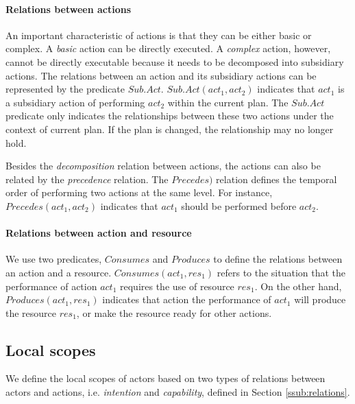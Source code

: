 \paragraph*{Relations between actions} %
\label{par:relations_between_actions}
An important characteristic of actions is that they can be either basic or complex. A \emph{basic} action can be directly executed. A \emph{complex} action, however, cannot be directly executable because it needs to be decomposed into subsidiary actions. The relations between an action and its subsidiary actions can be represented by the predicate $Sub.Act$. $Sub.Act(act_1, act_2)$ indicates that $act_1$ is a subsidiary action of performing $act_2$ within the current plan. The $Sub.Act$ predicate only indicates the relationships between these two actions under the context of current plan. If the plan is changed, the relationship may no longer hold.

Besides the \emph{decomposition} relation between actions, the actions can also be related by the \emph{precedence} relation. The $Precedes)$ relation defines the temporal order of performing two actions at the same level. For instance, $Precedes(act_1, act_2)$ indicates that $act_1$ should be performed before $act_2$. 

\paragraph*{Relations between action and resource} %
\label{par:relations_between_action_and_resource}
We use two predicates, $Consumes$ and $Produces$ to define the relations between an action and a resource. $Consumes(act_1, res_1)$ refers to the situation that the performance of action $act_1$ requires the use of resource $res_1$. On the other hand, $Produces(act_1, res_1)$ indicates that action the performance of $act_1$ will produce the resource $res_1$, or make the resource ready for other actions.


\subsection{Local scopes} %
\label{sub:local_scopes}
We define the local scopes of actors based on two types of relations between actors and actions, i.e. \emph{intention} and \emph{capability}, defined in Section \ref{ssub:relations}. 

